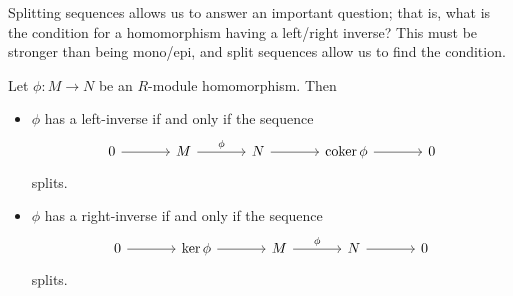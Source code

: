 Splitting sequences allows us to answer an important question; that is, what is the condition for a homomorphism having a left/right inverse? This must be stronger than being mono/epi, and split sequences allow us to find the condition.
\begin{proposition}\label{prp:3.7.2}
	Let $\phi : M \to N$ be an $R$-module homomorphism. Then
	\begin{itemize}
		\item $\phi $ has a left-inverse if and only if the sequence
			\[\begin{tikzcd}[row sep=2.5em, column sep=3.5em]
				0\arrow[r]&M\arrow[r, "\phi "]&N\arrow[r]&\coker \phi \arrow[r]&0
			\end{tikzcd}\]
			splits.
		\item $\phi $ has a right-inverse if and only if the sequence
			\[\begin{tikzcd}[row sep=2.5em, column sep=3.5em]
				0\arrow[r]&\ker \phi \arrow[r]&M\arrow[r, "\phi "]&N\arrow[r]&0
			\end{tikzcd}\]
			splits.
	\end{itemize}
\end{proposition}
